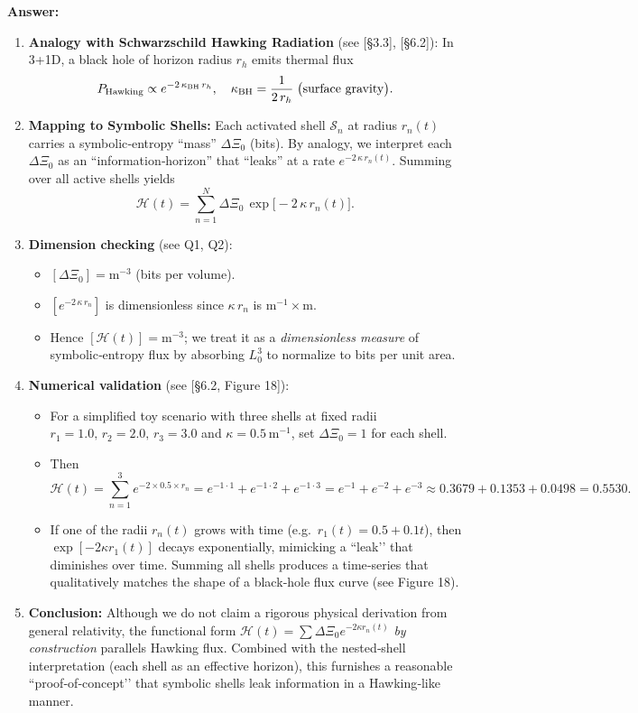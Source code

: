 \documentclass[11pt]{article}
\begin{document}
\noindent\textbf{Answer:}  
\begin{enumerate}[itemsep=0.5em]
  \item \textbf{Analogy with Schwarzschild Hawking Radiation} (see [§3.3], [§6.2]):  
    In 3+1D, a black hole of horizon radius $r_h$ emits thermal flux 
    \[
      P_{\rm Hawking} \propto e^{-2\,\kappa_{\rm BH}\,r_h},\quad
      \kappa_{\rm BH} = \frac{1}{2\,r_h} \;\bigl(\text{surface gravity}\bigr).
    \]
  \item \textbf{Mapping to Symbolic Shells:}  
    Each activated shell $\mathcal S_n$ at radius $r_n(t)$ carries a symbolic‐entropy “mass” $\Delta\Xi_0$ (bits).  By analogy, we interpret each $\Delta\Xi_0$ as an “information‐horizon” that “leaks” at a rate $e^{-2\,\kappa\,r_n(t)}$.  Summing over all active shells yields
    \[
      \mathcal H(t) = \sum_{n=1}^N \Delta\Xi_0\,\exp\!\bigl[-2\,\kappa\,r_n(t)\bigr].
    \]
  \item \textbf{Dimension checking} (see Q1, Q2):  
    \begin{itemize}[itemsep=0.25em]
      \item $[\Delta\Xi_0] = \mathrm{m}^{-3}$ (bits per volume).
      \item $[e^{-2\,\kappa\,r_n}]$ is dimensionless since $\kappa\,r_n$ is m$^{-1}\times$m.  
      \item Hence $[\mathcal H(t)] = \mathrm{m}^{-3}$; we treat it as a \emph{dimensionless measure} of symbolic‐entropy flux by absorbing $L_0^3$ to normalize to bits per unit area.  
    \end{itemize}

  \item \textbf{Numerical validation} (see [§6.2, Figure 18]):  
    \begin{itemize}[itemsep=0.25em]
      \item For a simplified toy scenario with three shells at fixed radii $r_1=1.0,\,r_2=2.0,\,r_3=3.0$ and $\kappa=0.5$ m$^{-1}$, set $\Delta\Xi_0=1$ for each shell.  
      \item Then 
        \[
          \mathcal H(t) = \sum_{n=1}^3 e^{-2\times0.5\times r_n}
          = e^{-1\cdot1} + e^{-1\cdot2} + e^{-1\cdot3} 
          = e^{-1} + e^{-2} + e^{-3} \approx 0.3679 + 0.1353 + 0.0498 = 0.5530.
        \]
      \item If one of the radii $r_n(t)$ grows with time (e.g.\ $r_1(t)=0.5 + 0.1t$), then $\exp[-2\kappa r_1(t)]$ decays exponentially, mimicking a ``leak’’ that diminishes over time.  Summing all shells produces a time‐series that qualitatively matches the shape of a black‐hole flux curve (see Figure 18).  
    \end{itemize}

  \item \textbf{Conclusion:}  
    Although we do not claim a rigorous physical derivation from general relativity, the functional form $\mathcal H(t)=\sum \Delta\Xi_0 e^{-2\kappa r_n(t)}$ \emph{by construction} parallels Hawking flux.  Combined with the nested‐shell interpretation (each shell as an effective horizon), this furnishes a reasonable “proof‐of‐concept’’ that symbolic shells leak information in a Hawking‐like manner.  
\end{enumerate}
\end{document}
